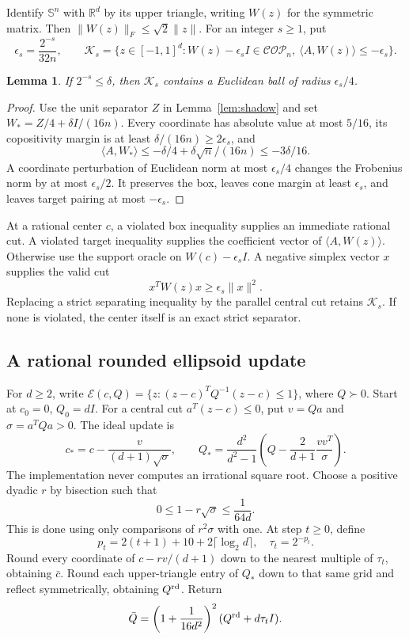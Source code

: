 \documentclass[11pt]{article}
\newtheorem{lemma}[theorem]{Lemma}
\theoremstyle{remark}\newtheorem{remark}[theorem]{Remark}
\newcommand{\COP}{\mathcal{COP}}
\newcommand{\ip}[2]{\langle #1,#2\rangle}
\newcommand{\norm}[1]{\lVert#1\rVert}
\begin{document}
Identify $\mathbb S^n$ with $\mathbb R^d$ by its upper triangle, writing $W(z)$ for the symmetric matrix. Then $\norm{W(z)}_F\le\sqrt2\norm z$. For an integer $s\ge1$, put
\[
 \epsilon_s=\frac{2^{-s}}{32n},\qquad
 \mathcal K_s=\{z\in[-1,1]^d:W(z)-\epsilon_s I\in\COP_n,
                               \ \ip A{W(z)}\le-\epsilon_s\}.
\]
\begin{lemma}\label{lem:ball}
If $2^{-s}\le\delta$, then $\mathcal K_s$ contains a Euclidean ball of radius $\epsilon_s/4$.
\end{lemma}
\begin{proof}
Use the unit separator $Z$ in Lemma~\ref{lem:shadow} and set
$W_*=Z/4+\delta I/(16n)$. Every coordinate has absolute value at most $5/16$, its copositivity margin is at least $\delta/(16n)\ge2\epsilon_s$, and
\[
 \ip A{W_*}\le-\delta/4+\delta\sqrt n/(16n)\le-3\delta/16.
\]
A coordinate perturbation of Euclidean norm at most $\epsilon_s/4$ changes the Frobenius norm by at most $\epsilon_s/2$. It preserves the box, leaves cone margin at least $\epsilon_s$, and leaves target pairing at most $-\epsilon_s$.
\end{proof}

At a rational center $c$, a violated box inequality supplies an immediate rational cut. A violated target inequality supplies the coefficient vector of $\ip A{W(z)}$. Otherwise use the support oracle on $W(c)-\epsilon_s I$. A negative simplex vector $x$ supplies the valid cut
\[
 x^TW(z)x\ge\epsilon_s\norm x^2.
\]
Replacing a strict separating inequality by the parallel central cut retains $\mathcal K_s$. If none is violated, the center itself is an exact strict separator.

\subsection{A rational rounded ellipsoid update}
For $d\ge2$, write
$\mathcal E(c,Q)=\{z:(z-c)^TQ^{-1}(z-c)\le1\}$, where $Q\succ0$.
Start at $c_0=0$, $Q_0=dI$. For a central cut $a^T(z-c)\le0$, put $v=Qa$ and $\sigma=a^TQa>0$. The ideal update is
\begin{equation}\label{eq:ellipsoid}
 c_*=c-\frac{v}{(d+1)\sqrt\sigma},\qquad
 Q_* =\frac{d^2}{d^2-1}\left(Q-\frac{2}{d+1}\frac{vv^T}{\sigma}\right).
\end{equation}
The implementation never computes an irrational square root. Choose a positive dyadic $r$ by bisection such that
\[
 0\le1-r\sqrt\sigma\le\frac1{64d}.
\]
This is done using only comparisons of $r^2\sigma$ with one. At step $t\ge0$, define
\begin{equation}\label{eq:round}
 p_t=2(t+1)+10+2\lceil\log_2d\rceil,\quad \tau_t=2^{-p_t}.
\end{equation}
Round every coordinate of $c-rv/(d+1)$ down to the nearest multiple of $\tau_t$, obtaining $\bar c$. Round each upper-triangle entry of $Q_*$ down to that same grid and reflect symmetrically, obtaining $Q^{\rm rd}$. Return
\begin{equation}\label{eq:roundedQ}
 \bar Q=\left(1+\frac1{16d^2}\right)^2(Q^{\rm rd}+d\tau_t I).
\end{equation}
\end{document}

